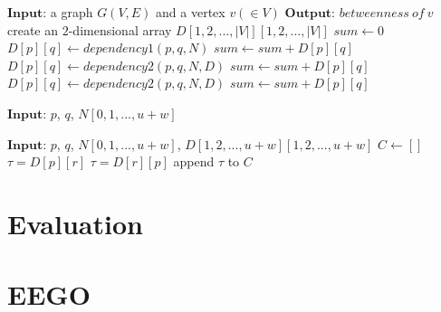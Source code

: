 \documentclass[preprint,12pt,authoryear]{elsarticle}
\theoremstyle{definition}
\begin{document}
\begin{algorithm}[t]
\label{alg:main}
\begin{algorithmic}[1]
\State $\mathbf{Input}$: a graph $G(V,E)$ and a vertex $v (\in V)$
\State $\mathbf{Output}$: $betweenness\ of\ {v}$
\State create an $2$-dimensional array $D[1,2,...,|V|][1,2,...,|V|]$ 
\State $sum \gets 0$
		\State $D[p][q] \gets dependency1(p, q, N)$
		\State $sum \gets sum + D[p][q]$
	\EndFor
		\State $D[p][q] \gets dependency2(p, q, N, D)$
		\State $sum \gets sum + D[p][q]$
	\EndFor
\EndFor
{} 
		\State $D[p][q] \gets dependency2(p, q, N, D)$
		\State $sum \gets sum + D[p][q]$
	\EndFor
\EndFor
\State {} 
\caption{$nodal\_betweenness(G(V,E), v)$}\label{alg:main}

\end{algorithmic}
\end{algorithm}
\begin{algorithm}[t]
\begin{algorithmic}[1]
\State $\mathbf{Input}$: $p$, $q$, $N[0,1,...,u+w]$
	\State {} 
\Else
	\State {} 
\EndIf
\caption{$dependency1(p, q, N)$}
\label{alg:dependency1}
\end{algorithmic}
\end{algorithm}
\begin{algorithm}[t]
\begin{algorithmic}[1]
\State $\mathbf{Input}$: $p$, $q$, $N[0,1,...,u+w]$, $D[1,2,...,u+w][1,2,...,u+w]$
\State $C \gets []$\;
		\State $\tau = D[p][r]$
	\Else 
		\State $\tau = D[r][p]$
	\EndIf
		\State {} 
	\Else 
		\State append $\tau$ to $C$
	\EndIf
\EndFor
\State {}    
\caption{$dependency2(p, q, N, D)$}
\label{alg:dependency2}
\end{algorithmic}
\end{algorithm}

\section{Evaluation}\label{evaluation}

\section{EEGO}\label{eego}
\end{document}
